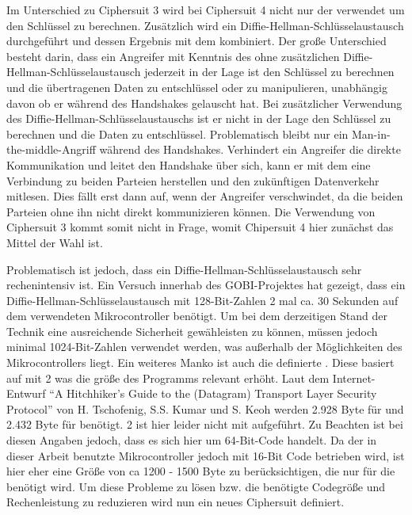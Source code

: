 Im Unterschied zu Ciphersuit 3 wird bei Ciphersuit 4 nicht nur der  verwendet um den Schlüssel zu berechnen. Zusätzlich wird ein
Diffie-Hellman-Schlüsselaustausch durchgeführt und dessen Ergebnis mit dem  kombiniert. Der große Unterschied besteht darin, dass
ein Angreifer mit Kenntnis des  ohne zusätzlichen Diffie-Hellman-Schlüsselaustausch jederzeit in der Lage ist den Schlüssel zu
berechnen und die übertragenen Daten zu entschlüssel oder zu manipulieren, unabhängig davon ob er während des Handshakes gelauscht hat.
Bei zusätzlicher Verwendung des Diffie-Hellman-Schlüsselaustauschs ist er nicht in der Lage den Schlüssel zu berechnen und die Daten zu
entschlüssel. Problematisch bleibt nur ein Man-in-the-middle-Angriff während des Handshakes. Verhindert ein Angreifer die direkte
Kommunikation und leitet den Handshake über sich, kann er mit dem  eine Verbindung zu beiden Parteien herstellen und den
zukünftigen Datenverkehr mitlesen. Dies fällt erst dann auf, wenn der Angreifer verschwindet, da die beiden Parteien ohne ihn nicht
direkt kommunizieren können. Die Verwendung von Ciphersuit 3 kommt somit nicht in Frage, womit Chipersuit 4 hier zunächst das Mittel
der Wahl ist.

Problematisch ist jedoch, dass ein Diffie-Hellman-Schlüsselaustausch sehr rechenintensiv ist. Ein Versuch innerhab des GOBI-Projektes hat
gezeigt, dass ein Diffie-Hellman-Schlüsselaustausch mit 128-Bit-Zahlen 2 mal ca. 30 Sekunden auf dem verwendeten Mikrocontroller benötigt.
Um bei dem derzeitigen Stand der Technik eine ausreichende Sicherheit gewähleisten zu können, müssen jedoch minimal 1024-Bit-Zahlen
verwendet werden, was außerhalb der Möglichkeiten des Mikrocontrollers liegt. Ein weiteres Manko ist auch die definierte .
Diese basiert auf  mit 2 was die größe des Programms relevant erhöht. Laut dem Internet-Entwurf "`A Hitchhiker's
Guide to the (Datagram) Transport Layer Security Protocol"' \cite{draftmintls} von H. Tschofenig, S.S. Kumar und S. Keoh werden
2.928 Byte für  und 2.432 Byte für  benötigt. 2 ist hier leider nicht mit aufgeführt. Zu Beachten ist bei diesen Angaben
jedoch, dass es sich hier um 64-Bit-Code handelt. Da der in dieser Arbeit benutzte Mikrocontroller jedoch mit 16-Bit Code betrieben wird, ist hier
eher eine Größe von ca 1200 - 1500 Byte zu berücksichtigen, die nur für die  benötigt wird. Um diese Probleme zu lösen bzw. die benötigte
Codegröße und Rechenleistung zu reduzieren wird nun ein neues Ciphersuit definiert.


